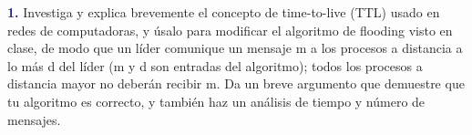 \newpage
\textbf{\textcolor{MidnightBlue}{1.}}
Investiga y explica brevemente el concepto de time-to-live (TTL) usado en redes de
computadoras, y úsalo para modificar el algoritmo de flooding visto en clase, de modo que un
líder comunique un mensaje m a los procesos a distancia a lo más d del líder (m y d son entradas
del algoritmo); todos los procesos a distancia mayor no deberán recibir m. Da un breve argumento
que demuestre que tu algoritmo es correcto, y también haz un análisis de tiempo y número de
mensajes.
